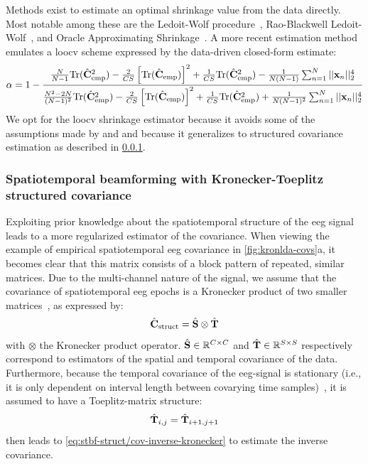 	Methods exist to estimate an optimal shrinkage value from the data directly.
	Most notable among these are the Ledoit-Wolf procedure~\cite{Ledoit2004},
	Rao-Blackwell Ledoit-Wolf~\cite{Chen2010}, and Oracle Approximating Shrinkage~\cite{Chen2010}.
  A more recent estimation method~\cite{Tong2018} emulates a \ac{loocv} scheme expressed by the data-driven closed-form
	estimate:
	\begin{equation}
		\alpha =
		1-\frac{
      \frac{N}{N-1}\text{Tr}(\hat{\mathbf{C}}_\text{emp}^2)
      - \frac{2}{CS}\left[\text{Tr}(\hat{\mathbf{C}}_\text{emp})\right]^2
      + \frac{1}{CS}\text{Tr}(\hat{\mathbf{C}}_\text{emp}^2)
			- \frac{1}{N(N-1)}\sum_{n=1}^N||\mathbf{x}_n||_2^4
		}
		{
      \frac{N^2 -2N}{(N-1)^2}\text{Tr}(\hat{\mathbf{C}}_\text{emp}^2)
      - \frac{2}{CS}\left[\text{Tr}(\hat{\mathbf{C}}_\text{emp})\right]^2
      + \frac{1}{CS}\text{Tr}(\hat{\mathbf{C}}_\text{emp}^2)
			+ \frac{1}{N(N-1)^2}\sum_{n=1}^N||\mathbf{x}_n||_2^4
		}
		\label{eq:loocv}
	\end{equation}
	We opt for the \ac{loocv} shrinkage estimator because it avoids some of the
	assumptions made by \textcite{Ledoit2004} and \textcite{Chen2010} and
	because it generalizes to structured covariance estimation as described in
	\cref{sec:stbf-struct/methods/structured-estimation}.

	\subsubsection{Spatiotemporal beamforming with Kronecker-Toeplitz structured covariance}
	\label{sec:stbf-struct/methods/structured-estimation}
	Exploiting prior knowledge about the spatiotemporal structure of the \ac{eeg} signal leads to a more regularized estimator of the covariance.
	When viewing the example of empirical spatiotemporal \ac{eeg} covariance in
	\cref{fig:kronlda-covs}a, it becomes clear that this matrix consists of a block pattern of repeated, similar matrices.
	Due to the multi-channel nature of the signal, we assume that the covariance of spatiotemporal \ac{eeg} epochs is a Kronecker
	product of two smaller
	matrices~\cite{Munck1992,DeMunck1999,Huizenga2002}, as expressed
	by:
	\begin{equation}
    \hat{\mathbf{C}}_\text{struct} = \hat{\mathbf{S}} \otimes \hat{\mathbf{T}}
		\label{eq:kronecker}
	\end{equation}
	with $\otimes$ the Kronecker product operator.
  $\hat{\mathbf{S}} \in \mathbb{R}^{C\times C}$ and $\hat{\mathbf{T}} \in \mathbb{R}^{S\times S}$ respectively correspond to estimators of the spatial and temporal covariance of the data.
	Furthermore, because the temporal covariance of the \ac{eeg}-signal is
	stationary (i.e., it is only dependent on interval length between covarying
	time samples)~\cite{Bijma2003}, it is assumed to have a Toeplitz-matrix structure:
	\begin{equation}
    \hat{\mathbf{T}}_{i,j} = \hat{\mathbf{T}}_{i+1,j+1}
		\label{eq:toeplitz}
	\end{equation}
	 then leads to
	\cref{eq:stbf-struct/cov-inverse-kronecker} to estimate the inverse
	covariance.

